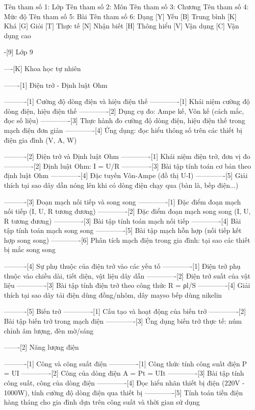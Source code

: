 
%
Tên tham số 1: Lớp
Tên tham số 2: Môn
Tên tham số 3: Chương
Tên tham số 4: Mức độ
Tên tham số 5: Bài
Tên tham số 6: Dạng
%
%
[Y] Yếu
[B] Trung bình
[K] Khá
[G] Giỏi
[T] Thực tế
[N] Nhận biết
[H] Thông hiểu
[V] Vận dụng
[C] Vận dụng cao

-[9] Lớp 9

----[K] Khoa học tự nhiên

-------[1] Điện trở - Định luật Ohm

----------[1] Cường độ dòng điện và hiệu điện thế
-------------[1] Khái niệm cường độ dòng điện, hiệu điện thế
-------------[2] Dụng cụ đo: Ampe kế, Vôn kế (cách mắc, đọc số liệu)
-------------[3] Thực hành đo cường độ dòng điện, hiệu điện thế trong mạch điện đơn giản
-------------[4] Ứng dụng: đọc hiểu thông số trên các thiết bị điện gia đình (V, A, W)

----------[2] Điện trở và Định luật Ohm
-------------[1] Khái niệm điện trở, đơn vị đo
-------------[2] Định luật Ohm: I = U/R
-------------[3] Bài tập tính toán cơ bản theo định luật Ohm
-------------[4] Đặc tuyến Vôn-Ampe (đồ thị U-I)
-------------[5] Giải thích tại sao dây dẫn nóng lên khi có dòng điện chạy qua (bàn là, bếp điện...)

----------[3] Đoạn mạch nối tiếp và song song
-------------[1] Đặc điểm đoạn mạch nối tiếp (I, U, R tương đương)
-------------[2] Đặc điểm đoạn mạch song song (I, U, R tương đương)
-------------[3] Bài tập tính toán mạch nối tiếp
-------------[4] Bài tập tính toán mạch song song
-------------[5] Bài tập mạch hỗn hợp (nối tiếp kết hợp song song)
-------------[6] Phân tích mạch điện trong gia đình: tại sao các thiết bị mắc song song

----------[4] Sự phụ thuộc của điện trở vào các yếu tố
-------------[1] Điện trở phụ thuộc vào chiều dài, tiết diện, vật liệu dây dẫn
-------------[2] Điện trở suất của vật liệu
-------------[3] Bài tập tính điện trở theo công thức R = ρl/S
-------------[4] Giải thích tại sao dây tải điện dùng đồng/nhôm, dây mayso bếp dùng nikelin

----------[5] Biến trở
-------------[1] Cấu tạo và hoạt động của biến trở
-------------[2] Bài tập biến trở trong mạch điện
-------------[3] Ứng dụng biến trở thực tế: núm chỉnh âm lượng, đèn mờ/sáng

-------[2] Năng lượng điện

----------[1] Công và công suất điện
-------------[1] Công thức tính công suất điện P = UI
-------------[2] Công của dòng điện A = Pt = UIt
-------------[3] Bài tập tính công suất, công của dòng điện
-------------[4] Đọc hiểu nhãn thiết bị điện (220V - 1000W), tính cường độ dòng điện qua thiết bị
-------------[5] Tính toán tiền điện hàng tháng cho gia đình dựa trên công suất và thời gian sử dụng

